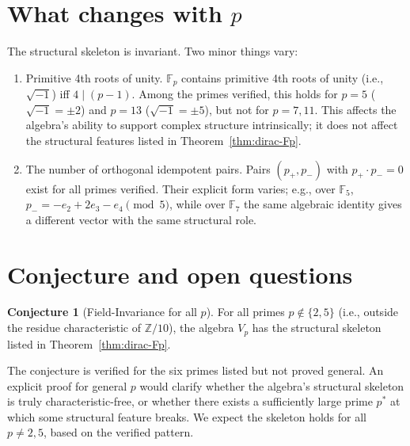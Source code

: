 \documentclass[11pt,reqno]{amsart}
\theoremstyle{plain}
\theoremstyle{definition}
\newtheorem{conjecture}[theorem]{Conjecture}
\theoremstyle{remark}
\newcommand{\Z}{\mathbb{Z}}
\newcommand{\F}{\mathbb{F}}
\begin{document}
\section{What changes with $p$}

The structural skeleton is invariant.  Two minor things vary:

\begin{enumerate}
\item Primitive 4th roots of unity. $\F_p$ contains primitive 4th roots
of unity (i.e., $\sqrt{-1}$) iff $4 \mid (p-1)$. Among the primes
verified, this holds for $p = 5$ ($\sqrt{-1} = \pm 2$) and $p = 13$
($\sqrt{-1} = \pm 5$), but not for $p = 7, 11$. This affects the algebra's
ability to support complex structure intrinsically; it does not affect
the structural features listed in Theorem~\ref{thm:dirac-Fp}.

\item The number of orthogonal idempotent pairs. Pairs $(p_+, p_-)$ with
$p_+ \cdot p_- = 0$ exist for all primes verified. Their explicit form
varies; e.g., over $\F_5$, $p_- = -e_2 + 2 e_3 - e_4 \pmod 5$, while over
$\F_7$ the same algebraic identity gives a different vector with the same
structural role.
\end{enumerate}

\section{Conjecture and open questions}

\begin{conjecture}[Field-Invariance for all $p$]\label{conj:fpuniv-allp}
For all primes $p \notin \{2, 5\}$ (i.e., outside the residue
characteristic of $\Z/10$), the algebra $V_p$ has the structural skeleton
listed in Theorem~\ref{thm:dirac-Fp}.
\end{conjecture}

The conjecture is verified for the six primes listed but not proved
general.  An explicit proof for general $p$ would clarify whether the
algebra's structural skeleton is truly characteristic-free, or whether
there exists a sufficiently large prime $p^*$ at which some structural
feature breaks.  We expect the skeleton holds for all $p \neq 2, 5$,
based on the verified pattern.
\end{document}
